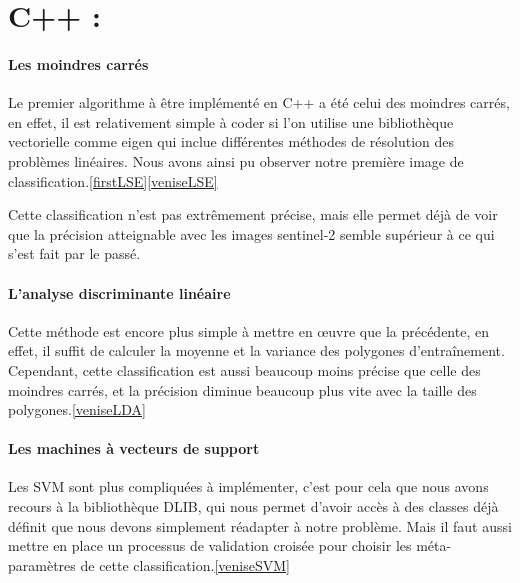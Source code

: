 \documentclass[a4paper,10pt]{report}
\begin{document}
\section{C++ :}
\paragraph{Les moindres carrés}
Le premier algorithme à être implémenté en C++ a été celui des moindres carrés, en effet, il est relativement simple à coder si l'on utilise une bibliothèque vectorielle comme eigen qui inclue différentes méthodes de résolution des problèmes linéaires. Nous avons ainsi pu observer notre première image de classification.\ref{firstLSE}\ref{veniseLSE}

Cette classification n'est pas extrêmement précise, mais elle permet déjà de voir que la précision atteignable avec les images sentinel-2 semble supérieur à ce qui s'est fait par le passé.
\paragraph{L'analyse discriminante linéaire}
Cette méthode est encore plus simple à mettre en \oe{}uvre que la précédente, en effet, il suffit de calculer la moyenne et la variance des polygones d'entraînement. Cependant, cette classification est aussi beaucoup moins précise que celle des moindres carrés, et la précision diminue beaucoup plus vite avec la taille des polygones.\ref{veniseLDA}
\paragraph{Les machines à vecteurs de support}
Les SVM sont plus compliquées à implémenter, c'est pour cela que nous avons recours à la bibliothèque DLIB, qui nous permet d'avoir accès à des classes déjà définit que nous devons simplement réadapter à notre problème. Mais il faut aussi mettre en place un processus de validation croisée pour choisir les méta-paramètres de cette classification.\ref{veniseSVM}



\end{document}
